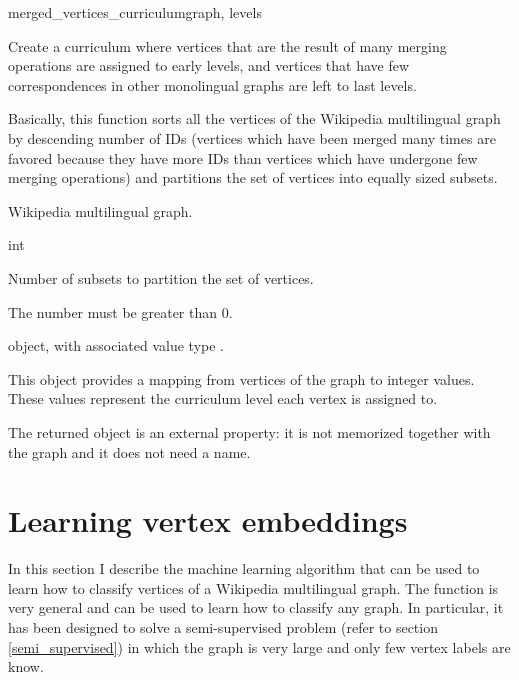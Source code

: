             \begin{independentfunctiondoc}{merged\_vertices\_curriculum}{graph, levels}
                \begin{functiondescription}
                    Create a curriculum where vertices that are the result of many merging operations are assigned to early levels, and vertices that have few correspondences in other monolingual graphs are left to last levels.
                    
                    Basically, this function sorts all the vertices of the Wikipedia multilingual graph by descending number of IDs (vertices which have been merged many times are favored because they have more IDs than vertices which have undergone few merging operations) and partitions the set of vertices into equally sized subsets.
                \end{functiondescription}
                
                \begin{functionparameters}
                    \item[graph] 
                    
                    Wikipedia multilingual graph.
                    \item[levels] int
                    
                    Number of subsets to partition the set of vertices.
                    
                    The number must be greater than 0.
                \end{functionparameters}
                
                \begin{functionoutput}
                     object, with associated value type .
                    
                    This object provides a mapping from vertices of the graph to integer values. These values represent the curriculum level each vertex is assigned to.
                    
                    The returned object is an external property: it is not memorized together with the graph and it does not need a name.
                \end{functionoutput}
            \end{independentfunctiondoc}
    \section{Learning vertex embeddings}
        In this section I describe the machine learning algorithm that can be used to learn how to classify vertices of a Wikipedia multilingual graph. The function is very general and can be used to learn how to classify any graph. In particular, it has been designed to solve a semi-supervised problem (refer to section \ref{semi_supervised}) in which the graph is very large and only few vertex labels are know.
        
